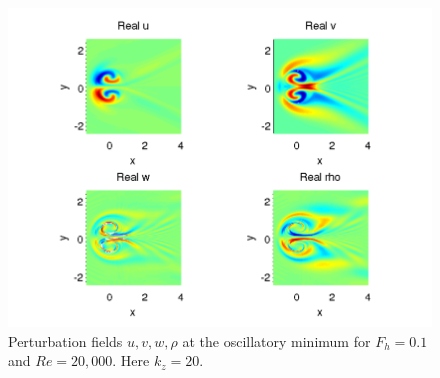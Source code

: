 \begin{figure}
\begin{center}
\includegraphics[width=\textwidth]{velocity_fields_kz_20}
\caption{Perturbation fields $u,v,w,\rho$ at the oscillatory minimum for $F_{h}=0.1$ and $Re=20{,}000$. Here $k_{z}=20$.}
\label{oscillation_fields}
\end{center}
\end{figure} 

